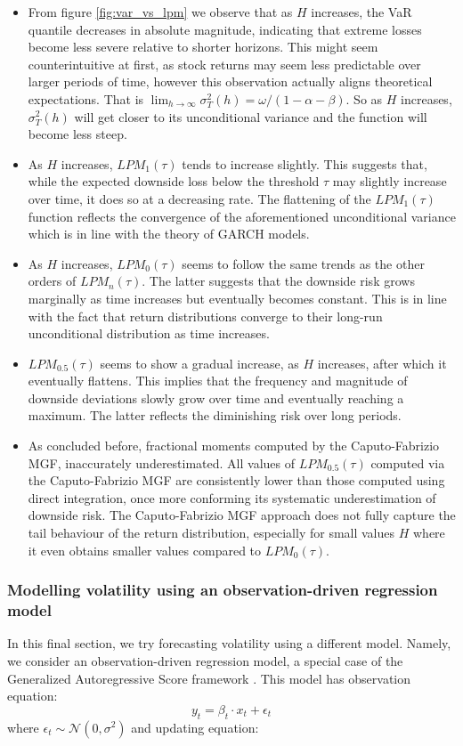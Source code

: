 \begin{itemize}
    \item From figure \ref{fig:var_vs_lpm} we observe that as \(H\) increases, the VaR quantile decreases in absolute magnitude, indicating that extreme losses become less severe relative to shorter horizons. This might seem counterintuitive at first, as stock returns may seem less predictable over larger periods of time, however this observation actually aligns theoretical expectations. That is \(\lim_{h \to \infty} \sigma^2_T(h) = \omega /(1 - \alpha - \beta)\). So as \(H\) increases, \(\sigma^2_T(h)\) will get closer to its unconditional variance and the function will become less steep.
\item As \(H\) increases, \(LPM_1(\tau)\) tends to increase slightly. This suggests that, while the expected downside loss below the threshold \(\tau\) may slightly increase over time, it does so at a decreasing rate. The flattening of the \(LPM_1(\tau)\) function reflects the convergence of the aforementioned unconditional variance which is in line with the theory of GARCH models.
\item As \(H\) increases, \(LPM_0(\tau)\) seems to follow the same trends as the other orders of \(LPM_n(\tau)\). The latter suggests that the downside risk grows marginally as time increases but eventually becomes constant. This is in line with the fact that return distributions converge to their long-run unconditional distribution as time increases.
\item \(LPM_{0.5}(\tau)\) seems to show a gradual increase, as \(H\) increases, after which it eventually flattens. This implies that the frequency and magnitude of downside deviations slowly grow over time and eventually reaching a maximum. The latter reflects the diminishing risk over long periods.
\item As concluded before, fractional moments computed by the Caputo-Fabrizio MGF, inaccurately underestimated. All values of \(LPM_{0.5}(\tau)\) computed via the Caputo-Fabrizio MGF are consistently lower than those computed using direct integration, once more conforming its systematic underestimation of downside risk. The Caputo-Fabrizio MGF approach does not fully capture the tail behaviour of the return distribution, especially for small values \(H\) where it even obtains smaller values compared to \(LPM_0(\tau)\).
\end{itemize}

\subsubsection{Modelling volatility using an observation-driven regression model}
In this final section, we try forecasting volatility using a different model. Namely, we consider an observation-driven regression model, a special case of the Generalized Autoregressive Score framework \cite{creal2013}.
This model has observation equation:
\begin{equation}
    y_t = \beta_t \cdot x_t + \epsilon_t
\end{equation}  
where \(\epsilon_t \sim \mathcal{N}(0, \sigma^2)\) and updating equation:


